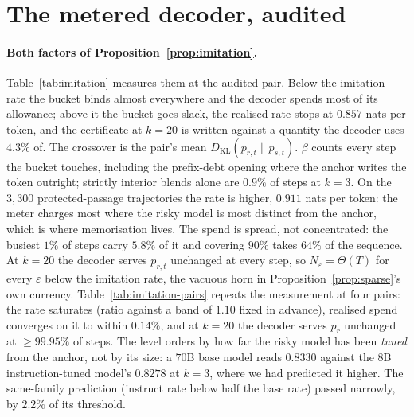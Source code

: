 
\section{The metered decoder, audited}\label{app:onset}

\paragraph{Both factors of Proposition~\ref{prop:imitation}.}
Table~\ref{tab:imitation} measures them at the audited pair. Below the imitation rate the bucket binds
almost everywhere and the decoder spends most of its allowance; above it the bucket goes slack, the
realised rate stops at $0.857$ nats per token, and the certificate at $k=20$ is written against a quantity
the decoder uses $4.3\%$ of. The crossover is the pair's mean $D_{\mathrm{KL}}(p_{r,t}\|p_{s,t})$. $\beta$ counts every step the
bucket touches, including the prefix-debt opening where the anchor writes the token outright;
strictly interior blends alone are $0.9\%$ of steps at $k=3$. On the
$3{,}300$ protected-passage trajectories the rate is higher, $0.911$ nats per token: the meter charges most
where the risky model is most distinct from the anchor, which is where memorisation lives. The spend is
spread, not concentrated: the busiest $1\%$ of steps carry $5.8\%$ of it and covering $90\%$ takes $64\%$ of
the sequence. At $k=20$ the decoder serves $p_{r,t}$ unchanged at every step, so $N_\varepsilon = \Theta(T)$
for every $\varepsilon$ below the imitation rate, the vacuous horn in Proposition~\ref{prop:sparse}'s own
currency. Table~\ref{tab:imitation-pairs} repeats the measurement at four pairs: the rate saturates (ratio
against a band of $1.10$ fixed in advance), realised spend converges on it to within $0.14\%$, and at $k=20$
the decoder serves $p_r$ unchanged at $\ge 99.95\%$ of steps. The level orders by how far the risky model
has been \emph{tuned} from the anchor, not by its size: a $70$B base model reads $0.8330$ against the $8$B
instruction-tuned model's $0.8278$ at $k=3$, where we had predicted it higher. The same-family prediction
(instruct rate below half the base rate) passed narrowly, by $2.2\%$ of its threshold.

